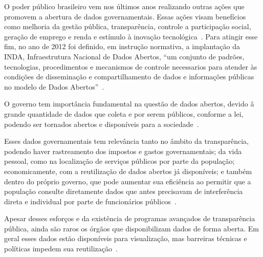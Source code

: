 O poder público brasileiro vem nos últimos anos realizando outras ações que promovem a abertura de dados governamentais. Essas ações visam benefícios como melhoria da gestão pública, transparência, controle a participação social, geração de emprego e renda e estímulo à inovação tecnológica~\cite{tcu}. Para atingir esse fim, no ano de 2012 foi definido, em instrução normativa, a implantação da INDA, Infraestrutura Nacional de Dados Abertos, \enquote{um conjunto de padrões, tecnologias, procedimentos e mecanismos de controle necessarios para atender às condições de disseminação e compartilhamento de dados e informações públicas no modelo de Dados Abertos}~\cite{inda}.  

O governo tem importância fundamental na questão de dados abertos, devido â grande quantidade de dados que coleta e por serem públicos, conforme a lei, podendo ser tornados abertos e disponíveis para a sociedade~\cite{openknowledge}.

Esses dados governamentais tem relevância tanto no âmbito da transparência, podendo haver rastreamento dos impostos e gastos governamentais; da vida pessoal, como na localização de serviços públicos por parte da população; economicamente, com a reutilização de dados abertos já disponíveis; e também dentro do próprio governo, que pode aumentar sua eficiência ao permitir que a população consulte diretamente dados que antes precisavam de interferência direta e individual por parte de funcionários públicos~\cite{openknowledge}.

Apesar desses esforços e da existência de programas avançados de transparência pública, ainda são raros os órgãos que disponibilizam dados de forma aberta. Em geral esses dados estão disponíveis para visualização, mas barreiras técnicas e políticas impedem sua reutilização~\cite{w3cmanual}.








